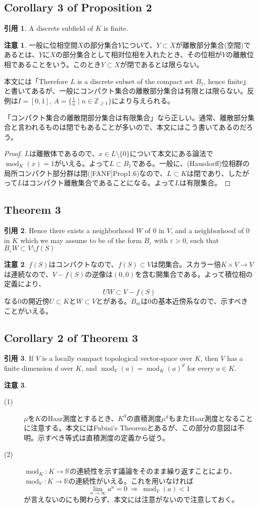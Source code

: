 \documentclass[12pt]{jsarticle}%
\renewenvironment{leftbar}{%
  \renewcommand\FrameCommand{\vrule width 1pt \hspace{10pt}}%
  \MakeFramed {\advance\hsize-\width \FrameRestore}}%
 {\endMakeFramed}
\newcommand{\barquo}[1]{\begin{leftbar} \begin{quo} #1 \end{quo} \end{leftbar}}%
\newcommand{\bfsubsection}[1]{\subsection*{\textbf{#1}}}
\theoremstyle{definition}%
\newtheorem*{rem}{注意}
\newtheorem*{quo}{引用}
\DeclareMathOperator{\module}{mod}%
\newcommand{\bbr}{{\mathbb R}}
\newcommand{\bbz}{{\mathbb Z}}
\newcommand{\Z}{\bbz}
\newcommand{\R}{\bbr}
\begin{document}
\bfsubsection{Corollary 3 of Proposition 2}
\barquo{ A discrete subfield of $K$ is finite.
}
\begin{rem}
一般に位相空間$X$の部分集合$Y$について、$Y \subset X$が離散部分集合(空間)であるとは、$Y$に$X$の部分集合として相対位相を入れたとき、その位相が$Y$の離散位相であることをいう。このとき$Y \subset X$が閉であるとは限らない。

本文には「Therefore $L$ is a discrete subset of the compact set $B_1$, hence finite」と書いてあるが、一般にコンパクト集合の離散部分集合は有限とは限らない。反例は$I = [0,1]$, $A = \{\frac{1}{n} \mid n \in \Z_{\geq 1} \}$により与えられる。

「コンパクト集合の離散閉部分集合は有限集合」なら正しい。通常、離散部分集合と言われるものは閉でもあることが多いので、本文にはこう書いてあるのだろう。
\end{rem}

\begin{proof}
$L$は離散体であるので、$x \in L \setminus \{ 0 \}$について本文にある論法で$\module_K(x) = 1$がいえる。よって$L \subset B_1$である。一般に、(Hausdorff)位相群の局所コンパクト部分群は閉([FANF]\cite{FANF}Prop1.6)なので、$L \subset K$は閉であり、したがって$L$はコンパクト離散集合であることになる。よって$L$は有限集合。
\end{proof}

\bfsubsection{Theorem 3}
\barquo{
Hence there exists a neighborhood $W$ of 0 in $V$, and a neighborhood of 0 in $K$ which we may assume to be of the form $B_{\varepsilon}$ with $\varepsilon > 0$, such that $B_{\varepsilon}W \subset V \setminus f(S)$}

\begin{rem}
$f(S)$はコンパクトなので、$f(S) \subset V$は閉集合。スカラー倍$K \times V \rightarrow V$は連続なので、$V - f(S)$の逆像は$(0,0)$を含む開集合である。よって積位相の定義により、
\[
UW \subset V - f(S)
\]
なる0の開近傍$U \subset K$と$W \subset V$とがある。$B_m$は0の基本近傍系なので、示すべきことがいえる。
\end{rem}

\bfsubsection{Corollary 2 of Theorem 3}
\barquo{
If $V$ is a locally compact topological vector-space over $K$, then $V$ has a finite dimension $d$ over $K$, and $\module_V (a)=\module_K(a)^d$ for every $a \in K$.
}

\begin{rem}　${}$%
  \begin{description}
    \item[(1)]$\mu$を$K$のHaar測度とするとき、$K^d$の直積測度$\mu^d$もまたHaar測度となることに注意する。本文にはFubini's Theoremとあるが、この部分の意図は不明。示すべき等式は直積測度の定義から従う。
    \item[(2)]$\module_K\colon K \rightarrow \R$の連続性を示す議論をそのまま繰り返すことにより、$\module_V \colon K \rightarrow \R$の連続性がいえる。これを用いなければ
    \[
    \lim_{n \rightarrow \infty} a^n = 0 \ \Rightarrow \  \module_V(a) < 1
    \]
    が言えないのにも関わらず、本文には注意がないので注意しておく。
  \end{description}
\end{rem}
\end{document}
